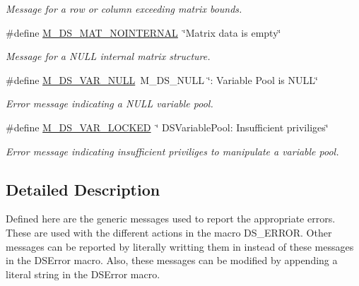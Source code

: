 \begin{DoxyCompactItemize}
\begin{DoxyCompactList}\small\item\em Message for a row or column exceeding matrix bounds. \item\end{DoxyCompactList}\item 
\hypertarget{group___m___d_s___messages_ga834bdead8f9b0e20331b57e051c7f379}{
\#define \hyperlink{group___m___d_s___messages_ga834bdead8f9b0e20331b57e051c7f379}{M\_\-DS\_\-MAT\_\-NOINTERNAL}~\char`\"{}Matrix data is empty\char`\"{}}
\label{group___m___d_s___messages_ga834bdead8f9b0e20331b57e051c7f379}

\begin{DoxyCompactList}\small\item\em Message for a NULL internal matrix structure. \item\end{DoxyCompactList}\item 
\hypertarget{group___m___d_s___messages_gac31f10e693824b630ea7bd80f59acadf}{
\#define \hyperlink{group___m___d_s___messages_gac31f10e693824b630ea7bd80f59acadf}{M\_\-DS\_\-VAR\_\-NULL}~M\_\-DS\_\-NULL \char`\"{}: Variable Pool is NULL\char`\"{}}
\label{group___m___d_s___messages_gac31f10e693824b630ea7bd80f59acadf}

\begin{DoxyCompactList}\small\item\em Error message indicating a NULL variable pool. \item\end{DoxyCompactList}\item 
\hypertarget{group___m___d_s___messages_gaa3430366ad7beeafb53737b0174c5a0b}{
\#define \hyperlink{group___m___d_s___messages_gaa3430366ad7beeafb53737b0174c5a0b}{M\_\-DS\_\-VAR\_\-LOCKED}~\char`\"{} DSVariablePool: Insufficient priviliges\char`\"{}}
\label{group___m___d_s___messages_gaa3430366ad7beeafb53737b0174c5a0b}

\begin{DoxyCompactList}\small\item\em Error message indicating insufficient priviliges to manipulate a variable pool. \item\end{DoxyCompactList}\end{DoxyCompactItemize}


\subsection{Detailed Description}
Defined here are the generic messages used to report the appropriate errors. These are used with the different actions in the macro DS\_\-ERROR. Other messages can be reported by literally writting them in instead of these messages in the DSError macro. Also, these messages can be modified by appending a literal string in the DSError macro.

